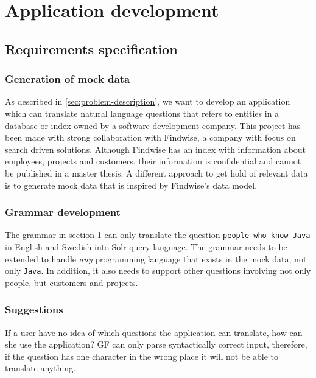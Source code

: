 \chapter{Application development}\label{ch:application-overview}

\section{Requirements specification}

\subsection{Generation of mock data}

As described in \autoref{sec:problem-description}, we want to develop an application which can translate natural language questions that refers to entities in a database or index owned by a software development company. This project has been made with strong collaboration with Findwise, a company with focus on search driven solutions. Although Findwise has an index with information about employees, projects and customers, their information is confidential and cannot be published in a master thesis. A different approach to get hold of relevant data is to generate mock data that is inspired by Findwise's data model.

\subsection{Grammar development}

The grammar in section 1 can only translate the question \texttt{people who know Java} in English and Swedish into Solr query language. The grammar needs to be extended to handle \emph{any} programming language that exists in the mock data, not only \texttt{Java}. In addition, it also needs to support other questions involving not only people, but customers and projects.

\subsection{Suggestions}

If a user have no idea of which questions the application can translate, how can she use the application? GF can only parse syntactically correct input, therefore, if the question has one character in the wrong place it will not be able to translate anything.

